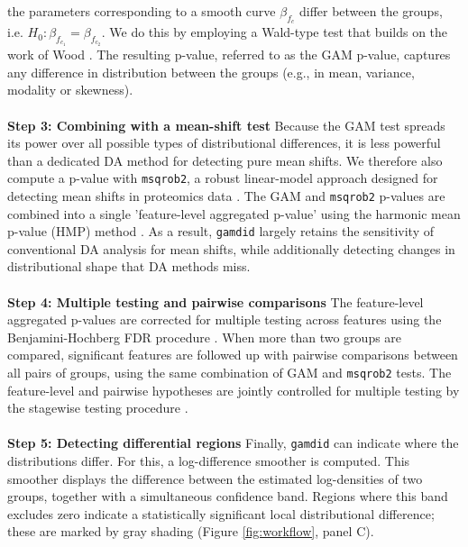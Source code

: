 {the parameters corresponding to a smooth curve $\beta_{f_c}$
differ between the groups, i.e. $H_0: \beta_{f_{c_1}} = \beta_{f_{c_2}}$.
We do this by employing a Wald-type test that builds on the work of Wood \cite{Wald}.
The resulting p-value, referred to as the GAM p-value, captures any difference in
distribution between the groups (e.g., in mean, variance, modality or skewness).
\\
\\
\textbf{Step 3: Combining with a mean-shift test}
Because the GAM test spreads its power over all possible types of distributional
differences,
it is less powerful than a dedicated DA method for detecting pure mean shifts.
We therefore also compute a p-value with \texttt{msqrob2}, a robust linear-model
approach designed for detecting mean shifts in proteomics data \cite{msqrob}.
The GAM and
\texttt{msqrob2} p-values are combined into a single 'feature-level aggregated
p-value' using the harmonic mean p-value (HMP) method \cite{harmonicp}.
As a result, \texttt{gamdid} largely retains the
sensitivity of conventional DA analysis for mean shifts, while additionally
detecting changes in distributional shape that DA methods miss.
\\
\\
\textbf{Step 4: Multiple testing and pairwise comparisons}
The feature-level aggregated p-values are corrected for multiple testing across
features using the Benjamini-Hochberg FDR procedure
\cite{BH_procedure}. When more than two groups are compared, significant features
are followed up with pairwise comparisons between all pairs of groups, using the
same combination of GAM and \texttt{msqrob2} tests. The feature-level and pairwise
hypotheses are jointly controlled for multiple testing by the stagewise testing
procedure \cite{stagewise_testing, stager}.
\\
\\
\textbf{Step 5: Detecting differential regions}
Finally, \texttt{gamdid} can indicate where the
distributions differ. For this, a log-difference smoother is computed. This
smoother displays the difference between the estimated log-densities of two
groups, together with a simultaneous confidence band. Regions where this
band excludes zero indicate a statistically significant local distributional
difference; these are marked by gray shading (Figure \ref{fig:workflow}, panel C).
}

